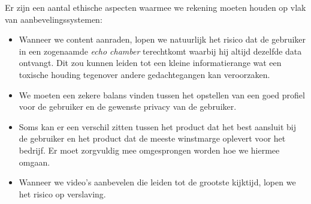 Er zijn een aantal ethische aspecten waarmee we rekening moeten houden op vlak van aanbevelingssystemen: 
\begin{itemize}
	\item Wanneer we content aanraden, lopen we natuurlijk het risico dat de gebruiker in een zogenaamde \textit{echo chamber} terechtkomt waarbij hij altijd dezelfde data ontvangt. Dit zou kunnen leiden tot een kleine informatierange wat een toxische houding tegenover andere gedachtegangen kan veroorzaken.
	\item We moeten een zekere balans vinden tussen het opstellen van een goed profiel voor de gebruiker en de gewenste privacy van de gebruiker.
	\item Soms kan er een verschil zitten tussen het product dat het best aansluit bij de gebruiker en het product dat de meeste winstmarge oplevert voor het bedrijf. Er moet zorgvuldig mee omgesprongen worden hoe we hiermee omgaan.
	\item Wanneer we video's aanbevelen die leiden tot de grootste kijktijd, lopen we het risico op verslaving.
\end{itemize}